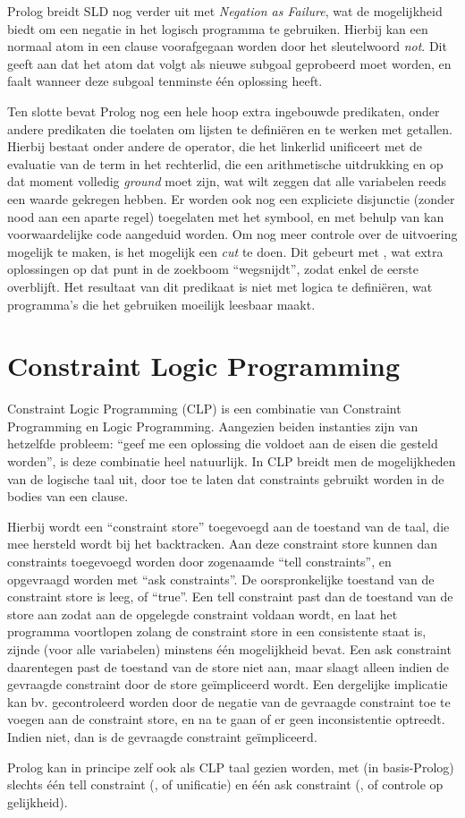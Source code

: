 Prolog breidt SLD nog verder uit met {\em Negation as Failure}, wat de mogelijkheid biedt om een negatie in het logisch programma te gebruiken. Hierbij kan een normaal atom in een clause voorafgegaan worden door het sleutelwoord {\em not}. Dit geeft aan dat het atom dat volgt als nieuwe subgoal geprobeerd moet worden, en faalt wanneer deze subgoal tenminste \'e\'en oplossing heeft.

Ten slotte bevat Prolog nog een hele hoop extra ingebouwde predikaten, onder andere predikaten die toelaten om lijsten te defini\"eren en te werken met getallen. Hierbij bestaat onder andere de  operator, die het linkerlid unificeert met de evaluatie van de term in het rechterlid, die een arithmetische uitdrukking en op dat moment volledig {\em ground} moet zijn, wat wilt zeggen dat alle variabelen reeds een waarde gekregen hebben. Er worden ook nog een expliciete disjunctie (zonder nood aan een aparte regel) toegelaten met het \code{;} symbool, en met behulp van \code{->} kan voorwaardelijke code aangeduid worden. Om nog meer controle over de uitvoering mogelijk te maken, is het mogelijk een {\em cut} te doen. Dit gebeurt met \code{!}, wat extra oplossingen op dat punt in de zoekboom ``wegsnijdt'', zodat enkel de eerste overblijft. Het resultaat van dit predikaat is niet met logica te defini\"eren, wat programma's die het gebruiken moeilijk leesbaar maakt.

\section{Constraint Logic Programming}

Constraint Logic Programming (CLP) is een combinatie van Constraint Programming en Logic Programming. Aangezien beiden instanties zijn van hetzelfde probleem: ``geef me een oplossing die voldoet aan de eisen die gesteld worden'', is deze combinatie heel natuurlijk. In CLP breidt men de mogelijkheden van de logische taal uit, door toe te laten dat constraints gebruikt worden in de bodies van een clause. 

Hierbij wordt een ``constraint store'' toegevoegd aan de toestand van de taal, die mee hersteld wordt bij het backtracken. Aan deze constraint store kunnen dan constraints toegevoegd worden door zogenaamde ``tell constraints'', en opgevraagd worden met ``ask constraints''. De oorspronkelijke toestand van de constraint store is leeg, of ``true''. Een tell constraint past dan de toestand van de store aan zodat aan de opgelegde constraint voldaan wordt, en laat het programma voortlopen zolang de constraint store in een consistente staat is, zijnde (voor alle variabelen) minstens \'e\'en mogelijkheid bevat. Een ask constraint daarentegen past de toestand van de store niet aan, maar slaagt alleen indien de gevraagde constraint door de store ge\"impliceerd wordt. Een dergelijke implicatie kan bv. gecontroleerd worden door de negatie van de gevraagde constraint toe te voegen aan de constraint store, en na te gaan of er geen inconsistentie optreedt. Indien niet, dan is de gevraagde constraint ge\"impliceerd.

Prolog kan in principe zelf ook als CLP taal gezien worden, met (in basis-Prolog) slechts \'e\'en tell constraint (\code{=}, of unificatie) en \'e\'en ask constraint (\code{==}, of controle op gelijkheid).

